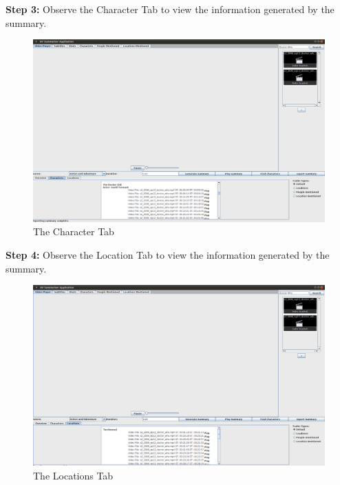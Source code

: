 \textbf{Step 3:} Observe the Character Tab to view the information generated by the summary. 
\begin{figure}[h1]
\begin{center}
 \includegraphics[trim = 0mm 0mm 0mm 0mm, clip,
 scale=0.22]{Images/03CharactersTab.png}
  \caption{The Character Tab}
 \end{center}
\end{figure}

\textbf{Step 4:} Observe the Location Tab to view the information generated by the summary. 
\begin{figure}[h1]
\begin{center}
 \includegraphics[trim = 0mm 0mm 0mm 0mm, clip,
 scale=0.2]{Images/04locationsTab.png}
  \caption{The Locations Tab}
 \end{center}
\end{figure}

\newpage

